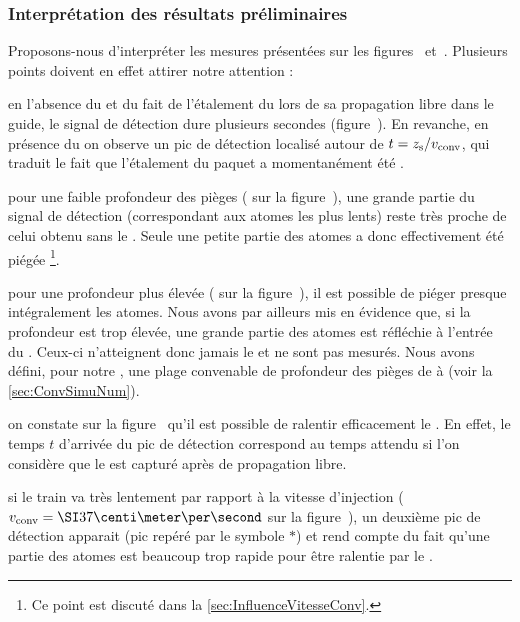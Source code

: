 \subsubsection{Interprétation des résultats préliminaires}
\noindent Proposons-nous d'interpréter les mesures présentées sur les figures~ et~. Plusieurs points doivent en effet attirer notre attention :
\begin{ditemize}
	\item en l'absence du \tpqp et du fait de l'étalement du \pat lors de sa propagation libre dans le guide, le signal de détection dure plusieurs secondes (figure~). En revanche, en présence du \tp on observe un pic de détection localisé autour de $t={{{z_{\rm s}}} / {{v_{\rm conv}}}}$, qui traduit le fait que l'étalement du paquet a momentanément été .
	\item pour une faible profondeur des pièges ( sur la figure~), une grande partie du signal de détection (correspondant aux atomes les plus lents) reste très proche de celui obtenu sans le \tp. Seule une petite partie des atomes a donc effectivement été piégée%
	\footnote{Ce point est discuté dans la \autoref{sec:InfluenceVitesseConv}.}. 
	\item pour une profondeur plus élevée ( sur la figure~), il est possible de piéger presque intégralement les atomes. Nous avons par ailleurs mis en évidence que, si la profondeur est trop élevée, une grande partie des atomes est réfléchie à l'entrée du \tp. Ceux-ci n'atteignent donc jamais le \lsonde et ne sont pas mesurés. Nous avons défini, pour notre \setup, une plage convenable de profondeur des pièges de  à  (voir la \autoref{sec:ConvSimuNum}). 
	\item on constate sur la figure~ qu'il est possible de ralentir efficacement le \pat. En effet, le temps $t$ d'arrivée du pic de détection correspond au temps attendu si l'on considère que le \p est capturé après  de propagation libre. 
	\item si le train va très lentement par rapport à la vitesse d'injection ($\vconv=\cmps{37}$ sur la figure~), un deuxième pic de détection apparait (pic repéré par le symbole $*$) et rend compte du fait qu'une partie des atomes est beaucoup trop rapide pour être ralentie par le \tp. 
\end{ditemize}



